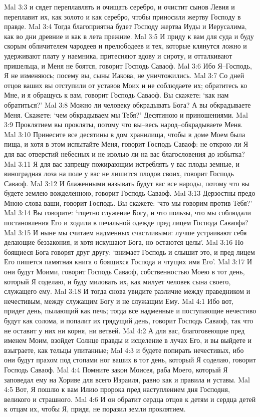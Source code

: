 Mal 3:3  и сядет переплавлять и очищать серебро, и очистит сынов Левия и переплавит их, как золото и как серебро, чтобы приносили жертву Господу в правде.
Mal 3:4  Тогда благоприятна будет Господу жертва Иуды и Иерусалима, как во дни древние и как в лета прежние.
Mal 3:5  И приду к вам для суда и буду скорым обличителем чародеев и прелюбодеев и тех, которые клянутся ложно и удерживают плату у наемника, притесняют вдову и сироту, и отталкивают пришельца, и Меня не боятся, говорит Господь Саваоф.
Mal 3:6  Ибо Я--Господь, Я не изменяюсь; посему вы, сыны Иакова, не уничтожились.
Mal 3:7  Со дней отцов ваших вы отступили от уставов Моих и не соблюдаете их; обратитесь ко Мне, и я обращусь к вам, говорит Господь Саваоф. Вы скажете: `как нам обратиться?'
Mal 3:8  Можно ли человеку обкрадывать Бога? А вы обкрадываете Меня. Скажете: `чем обкрадываем мы Тебя?' Десятиною и приношениями.
Mal 3:9  Проклятием вы прокляты, потому что вы--весь народ--обкрадываете Меня.
Mal 3:10  Принесите все десятины в дом хранилища, чтобы в доме Моем была пища, и хотя в этом испытайте Меня, говорит Господь Саваоф: не открою ли Я для вас отверстий небесных и не изолью ли на вас благословения до избытка?
Mal 3:11  Я для вас запрещу пожирающим истреблять у вас плоды земные, и виноградная лоза на поле у вас не лишится плодов своих, говорит Господь Саваоф.
Mal 3:12  И блаженными называть будут вас все народы, потому что вы будете землею вожделенною, говорит Господь Саваоф.
Mal 3:13  Дерзостны предо Мною слова ваши, говорит Господь. Вы скажете: `что мы говорим против Тебя?'
Mal 3:14  Вы говорите: `тщетно служение Богу, и что пользы, что мы соблюдали постановления Его и ходили в печальной одежде пред лицем Господа Саваофа?
Mal 3:15  И ныне мы считаем надменных счастливыми: лучше устраивают себя делающие беззакония, и хотя искушают Бога, но остаются целы'.
Mal 3:16  Но боящиеся Бога говорят друг другу: `внимает Господь и слышит это, и пред лицем Его пишется памятная книга о боящихся Господа и чтущих имя Его'.
Mal 3:17  И они будут Моими, говорит Господь Саваоф, собственностью Моею в тот день, который Я соделаю, и буду миловать их, как милует человек сына своего, служащего ему.
Mal 3:18  И тогда снова увидите различие между праведником и нечестивым, между служащим Богу и не служащим Ему.
Mal 4:1  Ибо вот, придет день, пылающий как печь; тогда все надменные и поступающие нечестиво будут как солома, и попалит их грядущий день, говорит Господь Саваоф, так что не оставит у них ни корня, ни ветвей.
Mal 4:2  А для вас, благоговеющие пред именем Моим, взойдет Солнце правды и исцеление в лучах Его, и вы выйдете и взыграете, как тельцы упитанные;
Mal 4:3  и будете попирать нечестивых, ибо они будут прахом под стопами ног ваших в тот день, который Я соделаю, говорит Господь Саваоф.
Mal 4:4  Помните закон Моисея, раба Моего, который Я заповедал ему на Хориве для всего Израиля, равно как и правила и уставы.
Mal 4:5  Вот, Я пошлю к вам Илию пророка пред наступлением дня Господня, великого и страшного.
Mal 4:6  И он обратит сердца отцов к детям и сердца детей к отцам их, чтобы Я, придя, не поразил земли проклятием.


